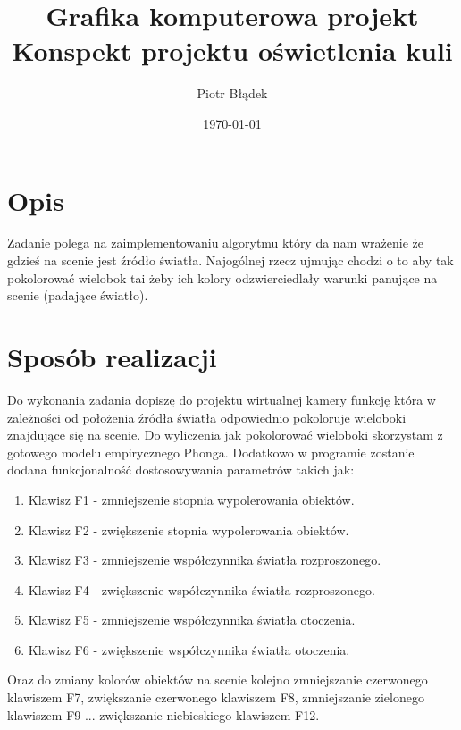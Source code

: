\documentclass[a4paper,11pt,notitlepage]{article}
\author{Piotr Błądek}
\title{Grafika komputerowa projekt \\ Konspekt projektu oświetlenia kuli}
\date{\today}
\begin{document}
\maketitle

\section{Opis}

Zadanie polega na zaimplementowaniu algorytmu który da nam wrażenie że gdzieś na scenie jest źródło światła. Najogólnej rzecz ujmując chodzi o to aby tak pokolorować wielobok tai żeby ich kolory odzwierciedlały warunki panujące na scenie (padające światło).

\section{Sposób realizacji}

Do wykonania zadania dopiszę do projektu wirtualnej kamery funkcję która w zależności od położenia źródła światła odpowiednio pokoloruje wieloboki znajdujące się na scenie. Do wyliczenia jak pokolorować wieloboki skorzystam z gotowego modelu empirycznego Phonga. Dodatkowo w programie zostanie dodana funkcjonalność dostosowywania parametrów takich jak:

\begin{enumerate}
 \item Klawisz F1 - zmniejszenie stopnia wypolerowania obiektów.
 \item Klawisz F2 - zwiększenie stopnia wypolerowania obiektów.
 \item Klawisz F3 - zmniejszenie współczynnika światła rozproszonego.
 \item Klawisz F4 - zwiększenie współczynnika światła rozproszonego.
 \item Klawisz F5 - zmniejszenie współczynnika światła otoczenia.
 \item Klawisz F6 - zwiększenie współczynnika światła otoczenia.
\end{enumerate}

Oraz do zmiany kolorów obiektów na scenie kolejno zmniejszanie czerwonego klawiszem F7, zwiększanie czerwonego klawiszem F8, zmniejszanie zielonego klawiszem F9 ... zwiększanie niebieskiego klawiszem F12.
\end{document}
